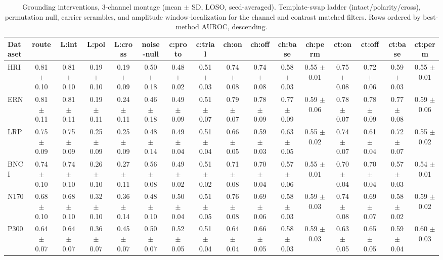 \begin{table}[t]
\centering
\setlength{\tabcolsep}{3pt}
\caption{Grounding interventions, 3-channel montage (mean $\pm$ SD, LOSO, seed-averaged). Template-swap ladder (intact/polarity/cross), permutation null, carrier scrambles, and amplitude window-localization for the channel and contrast matched filters. Rows ordered by best-method AUROC, descending.}
\label{sup:tab-grounding-3}
\begin{tabular}{lccccccccccccccc}
\toprule
Dataset & route & L:int & L:pol & L:cross & noise-null & c:proto & c:trial & ch:on & ch:off & ch:base & ch:perm & ct:on & ct:off & ct:base & ct:perm \\
\midrule
HRI & 0.81 $\pm$ 0.10 & 0.81 $\pm$ 0.10 & 0.19 $\pm$ 0.10 & 0.19 $\pm$ 0.09 & 0.50 $\pm$ 0.18 & 0.48 $\pm$ 0.02 & 0.51 $\pm$ 0.03 & 0.74 $\pm$ 0.08 & 0.74 $\pm$ 0.08 & 0.58 $\pm$ 0.03 & 0.55 $\pm$ 0.01 & 0.75 $\pm$ 0.08 & 0.72 $\pm$ 0.06 & 0.59 $\pm$ 0.03 & 0.55 $\pm$ 0.01 \\
ERN & 0.81 $\pm$ 0.11 & 0.81 $\pm$ 0.11 & 0.19 $\pm$ 0.11 & 0.24 $\pm$ 0.11 & 0.46 $\pm$ 0.18 & 0.49 $\pm$ 0.09 & 0.51 $\pm$ 0.07 & 0.79 $\pm$ 0.07 & 0.78 $\pm$ 0.09 & 0.77 $\pm$ 0.09 & 0.59 $\pm$ 0.06 & 0.78 $\pm$ 0.07 & 0.78 $\pm$ 0.09 & 0.77 $\pm$ 0.08 & 0.59 $\pm$ 0.06 \\
LRP & 0.75 $\pm$ 0.09 & 0.75 $\pm$ 0.09 & 0.25 $\pm$ 0.09 & 0.25 $\pm$ 0.09 & 0.48 $\pm$ 0.14 & 0.49 $\pm$ 0.04 & 0.51 $\pm$ 0.04 & 0.66 $\pm$ 0.05 & 0.59 $\pm$ 0.03 & 0.63 $\pm$ 0.05 & 0.55 $\pm$ 0.02 & 0.74 $\pm$ 0.07 & 0.61 $\pm$ 0.04 & 0.72 $\pm$ 0.07 & 0.55 $\pm$ 0.02 \\
BNCI & 0.74 $\pm$ 0.10 & 0.74 $\pm$ 0.10 & 0.26 $\pm$ 0.10 & 0.27 $\pm$ 0.11 & 0.56 $\pm$ 0.08 & 0.49 $\pm$ 0.02 & 0.51 $\pm$ 0.02 & 0.71 $\pm$ 0.08 & 0.70 $\pm$ 0.04 & 0.57 $\pm$ 0.06 & 0.55 $\pm$ 0.01 & 0.70 $\pm$ 0.04 & 0.70 $\pm$ 0.04 & 0.57 $\pm$ 0.03 & 0.54 $\pm$ 0.01 \\
N170 & 0.68 $\pm$ 0.10 & 0.68 $\pm$ 0.10 & 0.32 $\pm$ 0.10 & 0.36 $\pm$ 0.14 & 0.48 $\pm$ 0.10 & 0.50 $\pm$ 0.04 & 0.51 $\pm$ 0.05 & 0.76 $\pm$ 0.08 & 0.69 $\pm$ 0.06 & 0.58 $\pm$ 0.03 & 0.59 $\pm$ 0.03 & 0.74 $\pm$ 0.08 & 0.69 $\pm$ 0.07 & 0.58 $\pm$ 0.02 & 0.59 $\pm$ 0.02 \\
P300 & 0.64 $\pm$ 0.07 & 0.64 $\pm$ 0.07 & 0.36 $\pm$ 0.07 & 0.45 $\pm$ 0.07 & 0.50 $\pm$ 0.07 & 0.52 $\pm$ 0.05 & 0.51 $\pm$ 0.04 & 0.64 $\pm$ 0.04 & 0.66 $\pm$ 0.05 & 0.58 $\pm$ 0.03 & 0.59 $\pm$ 0.03 & 0.63 $\pm$ 0.05 & 0.65 $\pm$ 0.05 & 0.59 $\pm$ 0.04 & 0.60 $\pm$ 0.03 \\

\end{tabular}
\end{table}
